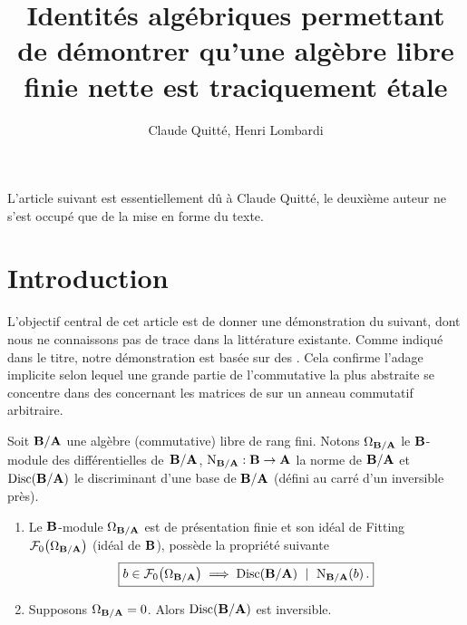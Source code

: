 \documentclass[12pt,twoside,a4paper]{article}
\begin{document}





\newcommand \DK{\mathscr{D}_{\rm K}} 
\newcommand \DN{\mathscr{D}_{\rm N}}
\newcommand \DD{\mathscr{D}_{\rm D}}
\newcommand \vepstar{\varepsilon^\star}
\newcommand \TrBA{\Tr\nolimits_{\gB/\gA}}
\newcommand \trace{\text{\rm trace}}
\renewcommand \norm{\text{\rm N}}
\renewcommand \disc{\text{\rm D}}
\newcommand \normBA{\norm_{\gB/\gA}}
\newcommand \DiscBA{\Disc(\gB/\gA)}
\newcommand \OmegaBA{\Omega_{\gB/\gA}}
\newcommand \swap{\mathrm {swap}}
\renewcommand \Lin{\mathrm {L}}
\newcommand \BoB{\gB\otimes_\gA\gB}
\newcommand \cercle[1]{\tikz[baseline=(char.base)]{
            \node[shape=circle,draw,inner sep = 0.4pt] (char){#1};}}
\newcommand \Bez {\mathscr{B}} %


\title{Identités algébriques permettant  de démontrer  qu'une algèbre libre finie nette est traciquement étale}
\author{Claude Quitté, Henri Lombardi}
\maketitle

L'article suivant est essentiellement dû à Claude Quitté, le deuxième auteur ne s'est occupé que de la mise en forme du texte.


\tableofcontents

\section {Introduction}

L'objectif central de cet article est de donner une démonstration \elr du  suivant, dont nous ne connaissons pas de trace dans la littérature existante. Comme  indiqué dans le titre, notre démonstration est basée sur des \idas. Cela confirme l'adage implicite selon lequel une grande partie de l'\alg commutative la plus abstraite se concentre dans des \idas concernant les matrices de \pols sur un anneau commutatif arbitraire. 


\begin {theorem} 
\label{NetteImpliesTracicEtale}

Soit $\mathbf{B}/\mathbf{A}$ une algèbre (commutative) libre de rang fini.  Notons
$\OmegaBA$ le $\mathbf{B}$-module des différentielles de~$\mathbf{B}/\mathbf{A}$,
$\normBA : \gB \to \gA$ la norme de $\mathbf{B}/\mathbf{A}$ et $\DiscBA$ le
discriminant d'une base de $\mathbf{B}/\mathbf{A}$ (défini au carré d'un
inversible près).

\begin {enumerate}
\item
Le $\mathbf{B}$-module $\OmegaBA$ est de présentation finie et son idéal de
Fitting $\cF_0\big(\OmegaBA\big)$ (idéal de $\mathbf{B}$), possède la
propriété suivante
$$
\fbox{$b \in \cF_0\big(\OmegaBA\big)  \implies
\DiscBA \ \mid\ \normBA(b)$\,.}
$$
\item
Supposons $\OmegaBA = 0$.  Alors $\DiscBA$ est inversible.
\end {enumerate}
\end {theorem}
\end{document}
